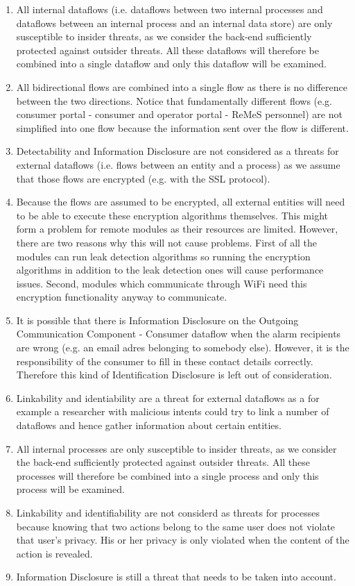 \begin{enumerate}
  \item All internal dataflows (i.e. dataflows between two internal processes
  and dataflows between an internal process and an internal data store) are only
  susceptible to insider threats, as we consider the back-end sufficiently
  protected against outsider threats. All these dataflows will therefore be
  combined into a single dataflow and only this dataflow will be examined.
  \item All bidirectional flows are combined into a single flow as there is no
  difference between the two directions. Notice that fundamentally different
  flows (e.g. consumer portal - consumer and operator portal - ReMeS personnel)
  are not simplified into one flow because the information sent over the flow
  is different.
  \item Detectability and Information Disclosure are not considered as a threats
  for external dataflows (i.e. flows between an entity and a process) as we
  assume that those flows are encrypted (e.g. with the SSL protocol).
  \item Because the flows are assumed to be encrypted, all external entities
  will need to be able to execute these encryption algorithms themselves. This
  might form a problem for remote modules as their resources are limited.
  However, there are two reasons why this will not cause problems. First of all
  the modules can run leak detection algorithms so running the encryption
  algorithms in addition to the leak detection ones will cause performance
  issues. Second, modules which communicate through WiFi need this encryption
  functionality anyway to communicate.
  \item It is possible that there is Information Disclosure on the Outgoing
  Communication Component - Consumer dataflow when the alarm recipients are
  wrong (e.g. an email adres belonging to somebody else). However, it is the
  responsibility of the consumer to fill in these contact details correctly.
  Therefore this kind of Identification Disclosure is left out of consideration.
  \item Linkability and identiability are a threat for external dataflows as a
  for example a researcher with malicious intents could try to link a number of
  dataflows and hence gather information about certain entities.

  \item All internal processes are only susceptible to insider threats, as we
  consider the back-end sufficiently protected against outsider threats. All
  these processes will therefore be combined into a single process and only
  this process will be examined. 
  \item Linkability and identifiability are not considerd as threats for
  processes because knowing that two actions belong to the same user does not
  violate that user's privacy. His or her privacy is only violated when the
  content of the action is revealed.
  \item Information Disclosure is still a threat that needs to be taken into
  account.
  

\end{enumerate}
